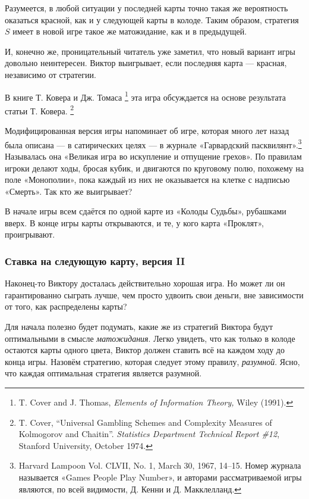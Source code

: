 Разумеется, в любой ситуации у последней карты точно такая же вероятность оказаться красной, как и у следующей карты в колоде.
Таким образом, стратегия $S$ имеет в новой игре такое же матожидание, как и в предыдущей.

И, конечно же, проницательный читатель уже заметил, что новый вариант игры довольно неинтересен.
Виктор выигрывает, если последняя карта --- красная, независимо от стратегии.
\heart

В книге Т. Ковера и Дж. Томаса%
\footnote{T. Cover and J. Thomas, \emph{Elements of Information Theory,} Wiley (1991).} 
эта игра обсуждается на основе результата статьи Т. Ковера.%
\footnote{T. Cover, ``Universal Gambling Schemes and Complexity Measures of Kolmogorov and Chaitin''. \emph{Statistics Department Technical Report \#12}, Stanford University, October 1974.}

Модифицированная версия игры %
напоминает об игре, которая много лет назад была описана --- в сатирических целях --- в журнале «Гарвардский пасквилянт».\footnote{Harvard Lampoon Vol. CLVII, No. 1, March 30, 1967, 14--15.
Номер журнала называется «Games People Play Number», и авторами рассматриваемой игры являются, по всей видимости, Д. Кенни и Д. Макклелланд.%
}
Называлась она «Великая игра во искупление и отпущение грехов».
По правилам игроки делают ходы, бросая кубик, и двигаются по круговому полю, похожему на поле «Монополии», пока каждый из них не оказывается на клетке с надписью «Смерть».
Так кто же выигрывает?

В начале игры всем сдаётся по одной карте из «Колоды Судьбы», рубашками вверх.
В конце игры карты открываются, и те, у кого карта «Проклят», проигрывают.

\subsubsection*{Ставка на следующую карту, версия II}%

Наконец-то Виктору досталась действительно хорошая игра.
Но может ли он гарантированно сыграть лучше, чем просто удвоить свои деньги, вне зависимости от того, как распределены карты?

\medskip

Для начала полезно будет подумать, какие же из стратегий Виктора будут оптимальными в смысле \emph{матожидания}.
Легко увидеть, что как только в колоде остаются карты одного цвета, Виктор должен ставить всё на каждом ходу до конца игры.
Назовём стратегию, которая следует этому правилу, \emph{разумной}.
Ясно, что каждая оптимальная стратегия является разумной.

